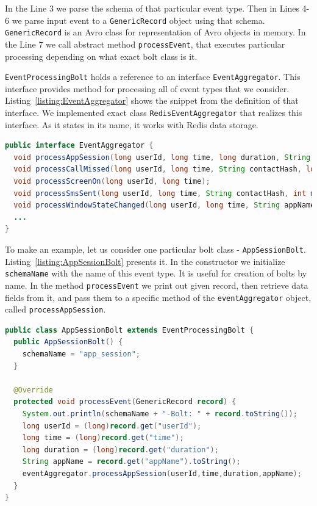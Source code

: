 In the Line 3 we parse the schema of that particular event type.
Then in Lines 4-6 we parse input event to a \lstinline{GenericRecord} object using that schema.
\lstinline{GenericRecord} is an Avro class for representation of Avro objects in memory.
In the Line 7 we call abstract method \lstinline{processEvent}, that executes particular processing depending on what exact bolt class is it.

\lstinline{EventProcessingBolt} holds a reference to an interface \lstinline{EventAggregator}.
This interface provides method for processing all of event types that we consider.
Listing~\ref{listing:EventAggregator} shows the snippet from the definition of that interface.
We implemented exact class \lstinline{RedisEventAggregator} that realizes this interface.
As it states in its name, it works with Redis data storage.

\begin{lstlisting}[float=h, caption=The partial listing of the interface EventAggregator., label=listing:EventAggregator, language=Java]
public interface EventAggregator {
  void processAppSession(long userId, long time, long duration, String appName);
  void processCallMissed(long userId, long time, String contactHash, long timestamp);
  void processScreenOn(long userId, long time);
  void processSmsSent(long userId, long time, String contactHash, int msgLength);
  void processWindowStateChanged(long userId, long time, String appName, String windowTitle);
  ...
}
\end{lstlisting}

To make an example, let us consider one particular bolt class - \lstinline{AppSessionBolt}.
Listing~\ref{listing:AppSessionBolt} presents it.
In the constructor we initialize \lstinline{schemaName} with the name of this event type.
It is useful for creation of bolts by name.
In the method \lstinline{processEvent} we print out given record, then retrieve data fields from it, and pass them to a specific method of the \lstinline{eventAggregator} object, called \lstinline{processAppSession}.

\begin{lstlisting}[float=h, caption=Implementation of AppSessionBolt class., label=listing:AppSessionBolt, language=Java]
public class AppSessionBolt extends EventProcessingBolt {
  public AppSessionBolt() {
    schemaName = "app_session";
  }

  @Override
  protected void processEvent(GenericRecord record) {
    System.out.println(schemaName + "-Bolt: " + record.toString());
    long userId = (long)record.get("userId");
    long time = (long)record.get("time");
    long duration = (long)record.get("duration");
    String appName = record.get("appName").toString();
    eventAggregator.processAppSession(userId,time,duration,appName);
  }
}
\end{lstlisting}

